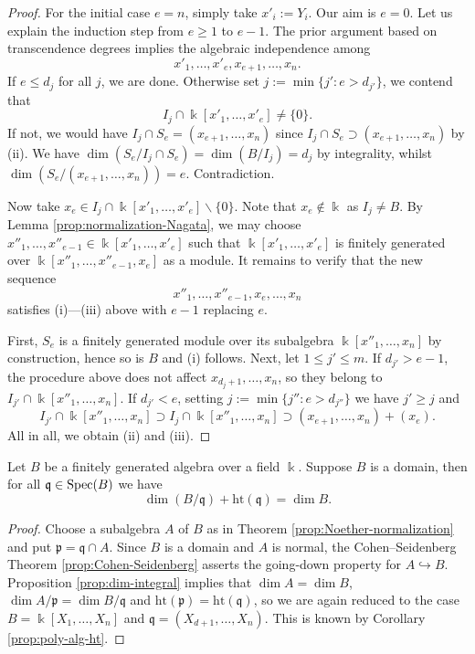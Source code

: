 \begin{proof}
	For the initial case $e=n$, simply take $x'_i := Y_i$. Our aim is $e=0$. Let us explain the induction step from $e \geq 1$ to $e-1$. The prior argument based on transcendence degrees implies the algebraic independence among
	\[ x'_1, \ldots, x'_e, x_{e+1}, \ldots, x_n. \]
	If $e \leq d_j$ for all $j$, we are done. Otherwise set $j := \min\{j': e > d_{j'} \}$, we contend that
	\[ I_j \cap \Bbbk[x'_1, \ldots, x'_e] \neq \{0\}. \]
	If not, we would have $I_j \cap S_e = (x_{e+1}, \ldots, x_n)$ since $I_j \cap S_e \supset (x_{e+1}, \ldots, x_n)$ by (ii). We have $\dim(S_e/I_j \cap S_e) = \dim(B/I_j) = d_j$ by integrality, whilst $\dim(S_e/(x_{e+1}, \ldots, x_n)) = e$. Contradiction.
	
	Now take $x_e \in I_j \cap \Bbbk[x'_1, \ldots, x'_e] \smallsetminus \{0\}$. Note that $x_e \notin \Bbbk$ as $I_j \neq B$. By Lemma \ref{prop:normalization-Nagata}, we may choose $x''_1, \ldots, x''_{e-1} \in \Bbbk[x'_1, \ldots, x'_e]$ such that $\Bbbk[x'_1, \ldots, x'_e]$ is finitely generated over $\Bbbk[x''_1, \ldots, x''_{e-1}, x_e]$ as a module. It remains to verify that the new sequence
	\[ x''_1, \ldots, x''_{e-1}, x_e, \ldots, x_n \]
	satisfies (i)---(iii) above with $e-1$ replacing $e$.
	
	First, $S_e$ is a finitely generated module over its subalgebra $\Bbbk[x''_1, \ldots, x_n]$ by construction, hence so is $B$ and (i) follows. Next, let $1 \leq j' \leq m$. If $d_{j'} > e-1$, the procedure above does not affect $x_{d_j + 1}, \ldots, x_n$, so they belong to $I_{j'} \cap \Bbbk[x''_1, \ldots, x_n]$. If $d_{j'} < e$, setting $j := \min\{j'' : e > d_{j''} \}$ we have $j' \geq j$ and
	\[ I_{j'} \cap \Bbbk[x''_1, \ldots, x_n] \supset I_j \cap \Bbbk[x''_1, \ldots, x_n] \supset (x_{e+1}, \ldots, x_n) + (x_e). \]
	All in all, we obtain (ii) and (iii).
\end{proof}

\begin{corollary}\label{prop:fg-dim-formula}
	Let $B$ be a finitely generated algebra over a field $\Bbbk$. Suppose $B$ is a domain, then for all $\mathfrak{q} \in \operatorname{Spec}(B)$ we have
	\[ \dim(B/\mathfrak{q}) + \mathrm{ht}(\mathfrak{q}) = \dim B. \]
\end{corollary}
\begin{proof}
	Choose a subalgebra $A$ of $B$ as in Theorem \ref{prop:Noether-normalization} and put $\mathfrak{p} = \mathfrak{q} \cap A$. Since $B$ is a domain and $A$ is normal, the Cohen--Seidenberg Theorem \ref{prop:Cohen-Seidenberg} asserts the going-down property for $A \hookrightarrow B$. Proposition \ref{prop:dim-integral} implies that $\dim A = \dim B$, $\dim A/\mathfrak{p} = \dim B/\mathfrak{q}$ and $\text{ht}(\mathfrak{p}) = \text{ht}(\mathfrak{q})$, so we are again reduced to the case $B = \Bbbk[X_1, \ldots, X_n]$ and $\mathfrak{q} = (X_{d+1}, \ldots, X_n)$. This is known by Corollary \ref{prop:poly-alg-ht}.
\end{proof}


